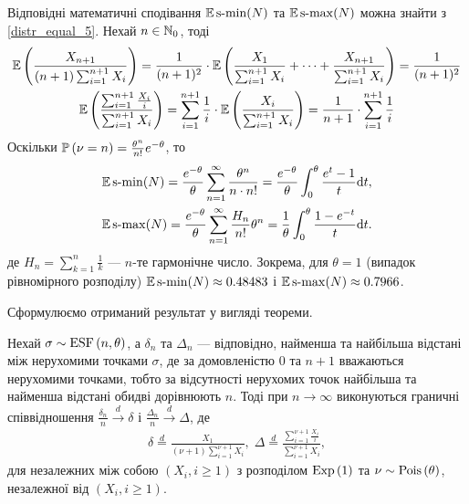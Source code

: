 Відповідні математичні сподівання $\E\smin(N)$ та $\E\smax(N)$ можна знайти з \eqref{distr_equal_5}. 
Нехай $n \in \N_0$, тоді
\begin{gather*}
    \E\left(
        \frac{X_{n+1}}{(n+1)\sum_{i=1}^{n+1} X_i}
    \right) = \frac{1}{(n+1)^2}\cdot \E \left(
        \frac{X_1}{\sum_{i=1}^{n+1} X_i} + \dots + \frac{X_{n+1}}{\sum_{i=1}^{n+1} X_i}
    \right) = \frac{1}{(n+1)^2} \\
    \E\left(
        \frac{\sum_{i=1}^{n+1} \frac{X_i}{i}}{\sum_{i=1}^{n+1} X_i}
    \right) = 
    \sum_{i=1}^{n+1} \frac{1}{i} \cdot \E\left(\frac{X_i}{\sum_{i=1}^{n+1} X_i}\right) = 
    \frac{1}{n+1} \cdot \sum_{i=1}^{n+1} \frac{1}{i}
\end{gather*}
Оскільки $\P{\nu = n} = \frac{\theta^n}{n!}e^{-\theta}$, то
\begin{gather*}
    \E\smin(N) = \frac{e^{-\theta}}{\theta}\sum_{n=1}^{\infty} \frac{\theta^n}{n\cdot n!} = 
    \frac{e^{-\theta}}{\theta}\int_0^\theta \frac{e^t-1}{t}\d t, \\
    \E\smax(N) = \frac{e^{-\theta}}{\theta}\sum_{n=1}^{\infty} \frac{H_n}{n!} \theta^n = 
    \frac{1}{\theta} \int_0^{\theta} \frac{1-e^{-t}}{t}\d t.
\end{gather*}
де $H_n = \sum_{k=1}^n \frac{1}{k}$ --- $n$-те гармонічне число.
Зокрема, для $\theta = 1$ (випадок рівномірного розподілу) 
$\E\smin(N) \approx 0.48483$ і $\E\smax(N) \approx 0.7966$.

Сформулюємо отриманий результат у вигляді теореми.
\begin{theorem}
    Нехай $\sigma \sim \ESF{n, \theta}$, а $\delta_n$ та $\Delta_n$ ---
    відповідно, найменша та найбільша відстані між нерухомими точками $\sigma$,
    де за домовленістю $0$ та $n+1$ вважаються нерухомими точками, тобто
    за відсутності нерухомих точок найбільша та найменша відстані обидві дорівнюють $n$.
    Тоді при $n\to\infty$ виконуються граничні
    співвідношення
    $\frac{\delta_n}{n} \overset{d}{\longrightarrow} \delta$ і 
    $\frac{\Delta_n}{n} \overset{d}{\longrightarrow} \Delta$, де
    \begin{gather}
        \delta \overset{d}{=}
        \frac{X_1}{(\nu+1)\sum_{i=1}^{\nu+1} X_i}, \;
        \Delta \overset{d}{=} 
        \frac{\sum_{i=1}^{\nu+1} \frac{X_i}{i}}{\sum_{i=1}^{\nu+1} X_i},
    \end{gather}
    для незалежних між собою $\left(X_i, i \geq 1\right)$
    з розподілом $\Exp{1}$ та $\nu \sim \Poiss{\theta}$,
    незалежної від $\left(X_i, i \geq 1\right)$.
\end{theorem}